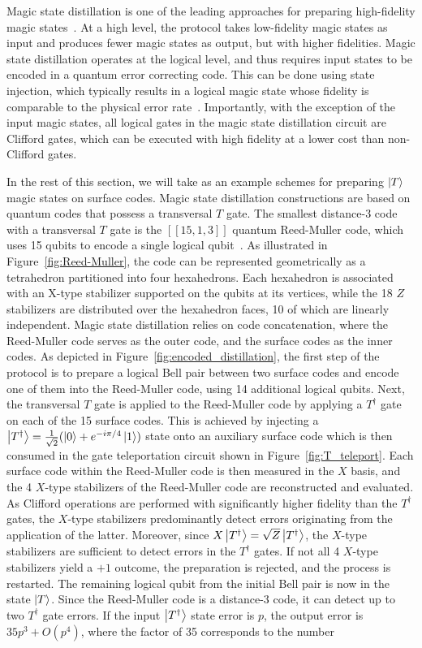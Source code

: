 \documentclass[%
 reprint,
superscriptaddress,
 amsmath,amssymb,
 aps,
]{revtex4-2}
\begin{document}
Magic state distillation is one of the leading approaches for preparing high-fidelity magic states~\cite{bravyi2005universal}. At a high level, the protocol takes low-fidelity magic states as input and produces fewer magic states as output, but with higher fidelities. Magic state distillation operates at the logical level, and thus requires input states to be encoded in a quantum error correcting code. This can be done using state injection, which typically results in a logical magic state whose fidelity is comparable to the physical error rate~\cite{li2015magic,gidney2023cleaner}. Importantly, with the exception of the input magic states, all logical gates in the magic state distillation circuit are Clifford gates, which can be executed with high fidelity at a lower cost than non-Clifford gates.

In the rest of this section, we will take as an example schemes for preparing $\ket{T}$ magic states on surface codes. Magic state distillation constructions are based on quantum codes that possess a transversal $T$ gate. The smallest distance-3 code with a transversal $T$ gate is the $[[15,1,3]]$ quantum Reed-Muller code, which uses 15 qubits to encode a single logical qubit~\cite{koutsioumpas2022smallest}. As illustrated in Figure~\ref{fig:Reed-Muller}, the code can be represented geometrically as a tetrahedron partitioned into four hexahedrons. Each hexahedron is associated with an X-type stabilizer supported on the qubits at its vertices, while the 18 $Z$ stabilizers are distributed over the hexahedron faces, 10 of which are linearly independent. Magic state distillation relies on code concatenation, where the Reed-Muller code serves as the outer code, and the surface codes as the inner codes. As depicted in Figure~\ref{fig:encoded_distillation}, the first step of the protocol is to prepare a logical Bell pair between two surface codes and encode one of them into the Reed-Muller code, using 14 additional logical qubits. Next, the transversal $T$ gate is applied to the Reed-Muller code by applying a $T^\dagger$ gate on each of the 15 surface codes. This is achieved by injecting a $\ket{T^\dagger} = \tfrac{1}{\sqrt{2}}(\ket{0} + e^{- i \pi/4} \ket{1})$ state onto an auxiliary surface code which is then consumed in the gate teleportation circuit shown in Figure~\ref{fig:T_teleport}. Each surface code within the Reed-Muller code is then measured in the $X$ basis, and the 4 $X$-type stabilizers of the Reed-Muller code are reconstructed and evaluated. As Clifford operations are performed with significantly higher fidelity than the $T^\dagger$ gates, the $X$-type stabilizers predominantly detect errors originating from the application of the latter. Moreover, since $X \ket{T^\dagger} = \sqrt{Z} \ket{T^\dagger}$, the $X$-type stabilizers are sufficient to detect errors in the $T^\dagger$ gates. If not all 4 $X$-type stabilizers yield a $+1$ outcome, the preparation is rejected, and the process is restarted. The remaining logical qubit from the initial Bell pair is now in the state $\ket{T}$. Since the Reed-Muller code is a distance-3 code, it can detect up to two $T^\dagger$ gate errors. If the input $\ket{T^\dagger}$ state error is $p$, the output error is $35p^3 + O(p^4)$, where the factor of 35 corresponds to the number 
\end{document}
